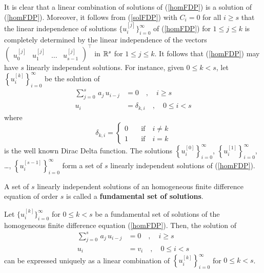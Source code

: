 It is clear that a linear combination of solutions of
(\ref{homFDP}) is a solution of (\ref{homFDP}).  Moreover, it follows
from (\ref{solFDP}) with $C_i = 0$ for all $i \geq s$ that the linear
independence of solutions $\{ u_i^{[j]} \}_{i=0}^\infty$ of
(\ref{homFDP}) for $1 \leq j \leq k$ is completely determined by the
linear independence of the vectors
$\displaystyle \begin{pmatrix} u_0^{[j]} & u_1^{[j]} & \ldots &
u_{s-1}^{[j]} \end{pmatrix}^\top$ in $\mathbb{R}^s$ for $1 \leq j \leq k$.
It follows that (\ref{homFDP}) may have $s$ linearly independent
solutions.  For instance, given $0 \leq k < s$, let
$\displaystyle \left\{ u_i^{[k]} \right\}_{i=0}^\infty$ be the solution of
\begin{align*}
\sum_{j=0}^s\,a_j\,u_{i-j} &= 0 \quad, \quad i \geq s \\
u_i &= \delta_{k,i} \quad, \quad 0 \leq i < s
\end{align*}
where
\[
\delta_{k,i} = \begin{cases}
0 & \quad \text{if} \quad i \neq k \\
1 & \quad \text{if} \quad i = k
\end{cases}
\]
is the well known Dirac Delta function.  The solutions
$\displaystyle \left\{ u_i^{[0]} \right\}_{i=0}^\infty$,
$\displaystyle \left\{ u_i^{[1]} \right\}_{i=0}^\infty$,
\ldots, $\displaystyle \left\{ u_i^{[s-1]} \right\}_{i=0}^\infty$
form a set of $s$ linearly independent solutions of (\ref{homFDP}).

\begin{defn}
A set of $s$ linearly independent solutions of an homogeneous finite
difference equation of order $s$ is called a
{\bfseries fundamental set of solutions}.
\end{defn}

\begin{theorem}
Let $\displaystyle \{ u_i^{[k]} \}_{i=0}^\infty$ for $0 \leq k < s$ be
a fundamental set of solutions of the homogeneous
finite difference equation (\ref{homFDP}).  Then, the solution of
\begin{align*}
\sum_{j=0}^s\,a_j\,u_{i-j} &= 0 \quad, \quad i \geq s \\
u_i &= v_i \quad, \quad 0 \leq i < s
\end{align*}
can be expressed uniquely as a linear combination of
$\displaystyle \left\{ u_i^{[k]} \right\}_{i=0}^\infty$ for $0 \leq k < s$.
\end{theorem}

